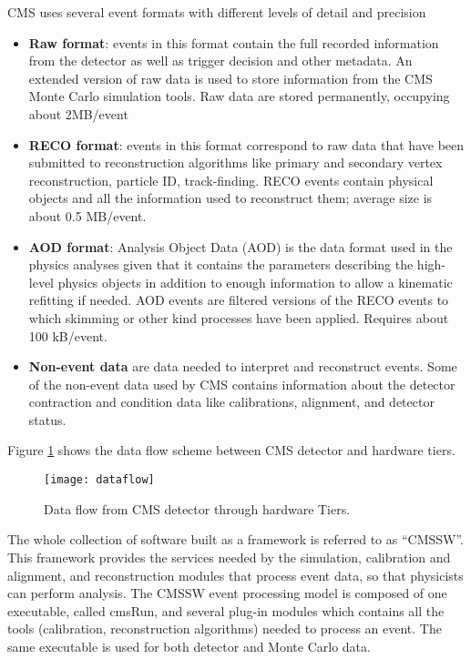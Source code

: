 \noindent CMS uses several event formats with different levels of detail and precision

\begin{itemize}
\item \textbf{Raw format}: events in this format contain the full recorded information from the detector as well as trigger decision and other metadata. An extended version of raw data is used to store information from the CMS Monte Carlo simulation tools. Raw data are stored permanently, occupying about 2MB/event   
\item \textbf{RECO format}: events in this format correspond to raw data that have been submitted to reconstruction algorithms like primary and secondary vertex reconstruction, particle ID, track-finding. RECO events contain physical objects and all the information used to reconstruct them; average size is about 0.5 MB/event.     
\item \textbf{AOD format}: Analysis Object Data (AOD) is the data format used in the physics analyses given that it contains the parameters describing the high-level physics objects in addition to enough information to allow a kinematic refitting if needed. AOD events are filtered versions of the RECO events to which skimming or other kind processes have been applied. Requires about 100 kB/event.
\item \textbf{Non-event data} are data needed to interpret and reconstruct events. Some of the non-event data used by CMS contains information about the detector contraction and condition data like calibrations, alignment, and detector status.  
\end{itemize}

\noindent Figure \ref{fig:dataflow} shows the data flow scheme between CMS detector and hardware tiers.

\begin{figure}[h!]
  \centering
  \texttt{[image: dataflow]}
  \caption[Data flow from CMS detector through hardware Tiers]{Data flow from CMS detector through hardware Tiers.}
  \label{fig:dataflow}
\end{figure}


\noindent  The whole collection of software built as a framework is referred to as ``CMSSW''. This framework provides the services needed by the simulation, calibration and alignment, and reconstruction modules that process event data, so that physicists can perform analysis. The CMSSW event processing model is composed of one executable, called cmsRun, and several plug-in modules which contains all the tools  (calibration, reconstruction algorithms) needed to process an event. The same executable is used for both detector and Monte Carlo data\cite{cmssw}.

